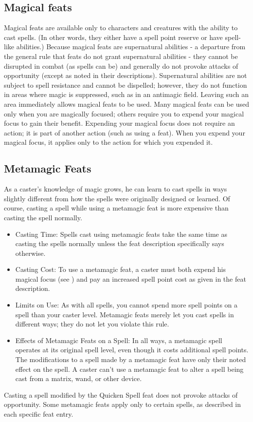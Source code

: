 \subsection{Magical feats}
Magical feats are available only to characters and creatures with the ability to cast spells. 
(In other words, they either have a spell point reserve or have spell-like abilities.)
Because magical feats are supernatural abilities - a departure from the general rule that feats do not grant supernatural abilities - 
they cannot be disrupted in combat (as spells can be) and generally do not provoke attacks of opportunity (except as noted in their descriptions). 
Supernatural abilities are not subject to spell resistance and cannot be dispelled; however, they do not function in areas where magic is suppressed, 
such as in an antimagic field. Leaving such an area immediately allows magical feats to be used.
Many magical feats can be used only when you are magically focused; others require you to expend your magical focus to gain their benefit. 
Expending your magical focus does not require an action; it is part of another action (such as using a feat). 
When you expend your magical focus, it applies only to the action for which you expended it.

\subsection{Metamagic Feats}
As a caster's knowledge of magic grows, he can learn to cast spells in ways slightly different from how the spells were originally designed or learned. 
Of course, casting a spell while using a metamagic feat is more expensive than casting the spell normally.
\begin{itemize}
\item Casting Time:
Spells cast using metamagic feats take the same time as casting the spells normally unless the feat description specifically says otherwise.
\item Casting Cost:
To use a metamagic feat, a caster must both expend his magical focus (see ) 
and pay an increased spell point cost as given in the feat description.
\item Limits on Use: 
As with all spells, you cannot spend more spell points on a spell than your caster level. 
Metamagic feats merely let you cast spells in different ways; they do not let you violate this rule. 
\item Effects of Metamagic Feats on a Spell: 
In all ways, a metamagic spell operates at its original spell level, even though it costs additional spell points. 
The modifications to a spell made by a metamagic feat have only their noted effect on the spell. 
A caster can't use a metamagic feat to alter a spell being cast from a matrix, wand, or other device.
\end{itemize}
Casting a spell modified by the Quicken Spell feat does not provoke attacks of opportunity.
Some metamagic feats apply only to certain spells, as described in each specific feat entry.

